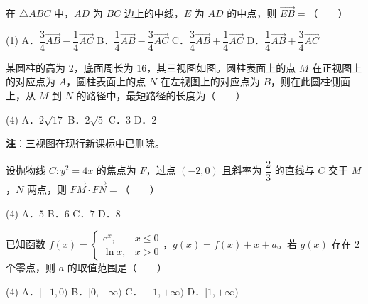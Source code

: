 \begin{question}
在 $\triangle ABC$ 中，$AD$ 为 $BC$ 边上的中线，$E$ 为 $AD$ 的中点，则 $\overrightarrow{EB}=$\mbox{（　　）}

\begin{gkopts}(1)
\task A．$\dfrac34\overrightarrow{AB}-\dfrac14\overrightarrow{AC}$
\task B．$\dfrac14\overrightarrow{AB}-\dfrac34\overrightarrow{AC}$
\task C．$\dfrac34\overrightarrow{AB}+\dfrac14\overrightarrow{AC}$
\task D．$\dfrac14\overrightarrow{AB}+\dfrac34\overrightarrow{AC}$
\end{gkopts}

\Needspace{0.4\textheight}
\end{question}
\begin{question}
某圆柱的高为 $2$，底面周长为 $16$，其三视图如图。圆柱表面上的点 $M$ 在正视图上的对应点为 $A$，圆柱表面上的点 $N$ 在左视图上的对应点为 $B$，则在此圆柱侧面上，从 $M$ 到 $N$ 的路径中，最短路径的长度为\mbox{（　　）}
\nopagebreak[4]
\begin{center}\end{center}
\nopagebreak[4]
\begin{gkopts}(4)
\task A．$2\sqrt{17}$
\task B．$2\sqrt5$
\task C．$3$
\task D．$2$
\end{gkopts}

\begin{gktip}
\textbf{注}：三视图在现行新课标中已删除。
\end{gktip}

\end{question}
\begin{question}
设抛物线 $C:y^{2}=4x$ 的焦点为 $F$，过点 $(-2,0)$ 且斜率为 $\dfrac23$ 的直线与 $C$ 交于 $M$，$N$ 两点，则 $\overrightarrow{FM}\cdot\overrightarrow{FN}=$\mbox{（　　）}

\begin{gkopts}(4)
\task A．$5$
\task B．$6$
\task C．$7$
\task D．$8$
\end{gkopts}

\end{question}
\begin{question}
已知函数 $f(x)=\begin{cases}\mathrm e^{x},&x\le0\\ \ln x,&x>0\end{cases}$，$g(x)=f(x)+x+a$。若 $g(x)$ 存在 $2$ 个零点，则 $a$ 的取值范围是\mbox{（　　）}

\begin{gkopts}(4)
\task A．$[-1,0)$
\task B．$[0,+\infty)$
\task C．$[-1,+\infty)$
\task D．$[1,+\infty)$
\end{gkopts}

\Needspace{0.4\textheight}
\end{question}

